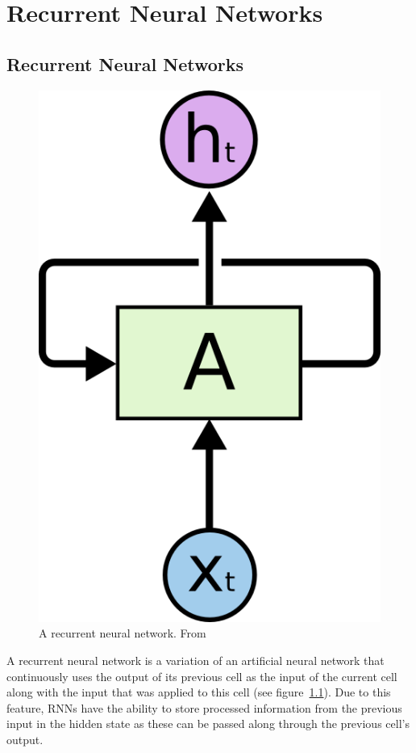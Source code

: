 \chapter{Recurrent Neural Networks}\label{ch:rnn}

\section{Recurrent Neural Networks}
\begin{figure}
	\begin{center}
		\includegraphics[scale=0.5]{rnn/rnn_rolled}
	\end{center}
	\caption{A recurrent neural network. From~\cite{olah2015understanding}\label{fig:rnn_img}}
\end{figure}

A recurrent neural network is a variation of an artificial neural network that continuously uses the output of its previous cell as the input of the current cell along with the input that was applied to this cell (see figure~\ref{fig:rnn_img}). Due to this feature, RNNs have the ability to store processed information from the previous input in the hidden state as these can be passed along through the previous cell's output. 

